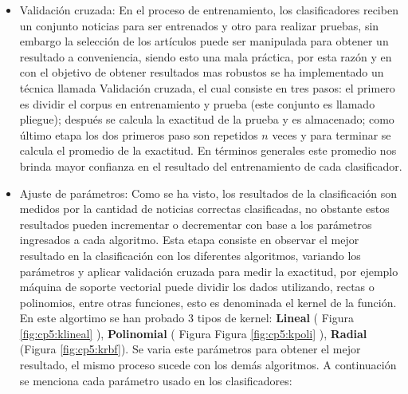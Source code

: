 \begin{enumerate}
\begin{itemize}
    \item Validación cruzada: En el proceso de entrenamiento, los clasificadores reciben un conjunto noticias para ser entrenados y otro para realizar pruebas, sin embargo la selección de los artículos puede ser manipulada para obtener un resultado a conveniencia, siendo esto una mala práctica, por esta razón y en con el objetivo de obtener resultados mas robustos se ha implementado un técnica llamada Validación cruzada, el cual consiste en tres pasos: el primero es dividir el corpus en entrenamiento y prueba (este conjunto es llamado pliegue); después se calcula la exactitud de la prueba y es almacenado; como último etapa los dos primeros paso son repetidos $n$ veces y para terminar  se calcula el promedio de la exactitud. En términos generales este promedio nos brinda mayor confianza en el resultado del entrenamiento de cada clasificador.\\

    \item Ajuste de parámetros: Como se ha visto, los resultados de la clasificación son medidos por la cantidad de noticias correctas clasificadas, no obstante estos resultados pueden incrementar o decrementar con base a los parámetros ingresados a cada algoritmo. Esta etapa consiste en observar el mejor resultado en la clasificación con los diferentes algoritmos, variando los parámetros y aplicar validación cruzada para medir la exactitud, por ejemplo máquina de soporte vectorial puede dividir los dados utilizando, rectas o polinomios, entre otras funciones, esto es denominada el kernel de la función. En este algortimo se han probado 3 tipos de kernel: \textbf{Lineal} ( Figura \ref{fig:cp5:klineal} ), \textbf{Polinomial} ( Figura Figura \ref{fig:cp5:kpoli} ), \textbf{Radial} (Figura \ref{fig:cp5:krbf}). Se varia este parámetros para obtener el mejor resultado, el mismo proceso sucede con los demás algoritmos. A continuación se menciona cada parámetro usado en los clasificadores:


\end{itemize}
\end{enumerate}
